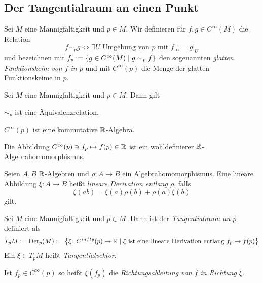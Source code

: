 \subsection{Der Tangentialraum an einen Punkt}
\label{sec:tpm}

\begin{definition}
  Sei $M$ eine Mannigfaltigkeit und $p\in M$. Wir definieren für $f,g
  \in C^\infty(M)$ die Relation
  \begin{equation*}
    f \sim_p g \iff \exists U\text{ Umgebung von $p$ mit } f|_U = g|_U
  \end{equation*}
  und bezeichnen mit $f_p := \left\lbrace g\in C^\infty(M) \mid g\sim_p f \right\rbrace$
  den sogenannten \emph{glatten Funktionskeim von $f$ in $p$} und mit
  $C^\infty(p)$ die Menge der glatten Funktionskeime in $p$.
\end{definition}

\begin{proposition}
  Sei $M$ eine Mannigfaltigkeit und $p\in M$. Dann gilt
  \begin{statements}
  \item $\sim_p$ ist eine Äquivalenzrelation.
  \item $C^\infty(p)$ ist eine kommutative $\mathbb{R}$-Algebra.
  \item Die Abbildung $C^\infty(p) \ni f_p \mapsto f(p) \in \mathbb{R}$ ist
    ein wohldefinierer $\mathbb{R}$-Algebrahomomorphismus. 
  \end{statements}
\end{proposition}

\begin{definition}
  Seien $A,B$ $\mathbb{R}$-Algebren und $\rho \colon A \to B$ ein
  Algebrahomomorphismus. Eine lineare Abbildung $\xi \colon A \to B$
  heißt \emph{lineare Derivation entlang $\rho$}, falls
  \begin{equation*}
    \xi(ab) = \xi(a)\rho(b) + \rho(a)\xi(b)
  \end{equation*}
  gilt.
\end{definition}

\begin{definition}
  Sei $M$ eine Mannigfaltigkeit und $p\in M$. Dann ist der
  \emph{Tangentialraum an $p$} definiert als
  \begin{equation*}
    T_pM := \operatorname{Der}_p(M) := \left\lbrace  \xi \colon C^{infty}(p) \to \mathbb{R}\mid
      \xi\text{ ist eine lineare Derivation entlang $f_p \mapsto f(p)$} \right\rbrace
  \end{equation*}
  Ein $\xi \in T_pM$ heißt \emph{Tangentialvektor}.

  Ist $f_p\in C^\infty(p)$ so heißt $\xi(f_p)$ die
  \emph{Richtungsableitung von $f$ in Richtung $\xi$}.
\end{definition}

